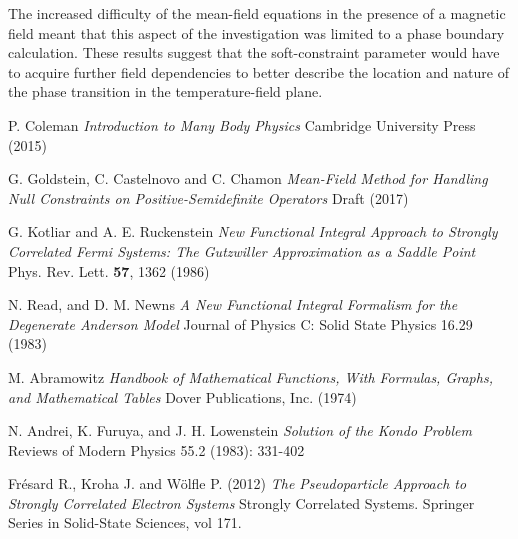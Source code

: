 \documentclass[12pt]{article}
\begin{document}
The increased difficulty of the mean-field equations in the presence of a magnetic field meant that this aspect of the investigation was limited to a phase boundary calculation. These results suggest that the soft-constraint parameter would have to acquire further field dependencies to better describe the location and nature of the phase transition in the temperature-field plane.

\newpage



\begin{thebibliography}{1}

P. Coleman
\emph{Introduction to Many Body Physics}
Cambridge University Press (2015)

G. Goldstein, C. Castelnovo and C. Chamon
\emph{Mean-Field Method for Handling Null Constraints on Positive-Semidefinite Operators}
Draft (2017)

G. Kotliar and A. E. Ruckenstein
\emph{New Functional Integral Approach to Strongly Correlated Fermi Systems: The Gutzwiller Approximation as a Saddle Point}
Phys. Rev. Lett. \textbf{57}, 1362 (1986)

N. Read, and D. M. Newns
\emph{A New Functional Integral Formalism for the Degenerate Anderson Model} Journal of Physics C: Solid State Physics 16.29 (1983)

M. Abramowitz
\emph{Handbook of Mathematical Functions, With Formulas, Graphs, and Mathematical Tables}
Dover Publications, Inc. (1974)

N. Andrei, K. Furuya, and J. H. Lowenstein
\emph{Solution of the Kondo Problem}
Reviews of Modern Physics 55.2 (1983): 331-402

Frésard R., Kroha J. and Wölfle P. (2012)
\emph{The Pseudoparticle Approach to Strongly Correlated Electron Systems}
Strongly Correlated Systems. Springer Series in Solid-State Sciences, vol 171.




\end{thebibliography}
\end{document}
